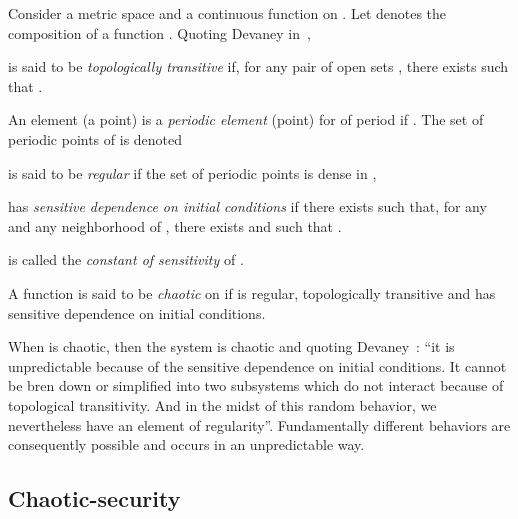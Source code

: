 \documentclass{llncs}
\begin{document}
Consider a metric space  and a continuous function  on . Let  denotes the  composition of a function . Quoting Devaney in~\cite{Devaney},

\begin{definition}
 is said to be \emph{topologically transitive} if, for any pair of open sets , there exists  such that .
\end{definition}

\begin{definition}
An element (a point)  is a \emph{periodic element} (point) for  of period  if . The set of periodic points of  is denoted 
\end{definition}

\begin{definition}
 is said to be \emph{regular} if the set of periodic points is dense in ,

\end{definition}

\begin{definition}
\label{sensitivity}  has \emph{sensitive dependence on initial conditions}
if there exists  such that, for any  and any neighborhood  of , there exists  and  such that .

 is called the \emph{constant of sensitivity} of .
\end{definition}


\begin{definition}
A function  is said to be \emph{chaotic} on  if  is regular, topologically transitive and has sensitive dependence on initial conditions.
\end{definition}

When  is chaotic, then the system  is chaotic and quoting Devaney~\cite{Devaney}: ``it is unpredictable because of the sensitive dependence on initial conditions. It cannot be bren down or simplified into two subsystems which do not interact because of topological transitivity. And in the midst of this random behavior, we nevertheless have an element of regularity''. Fundamentally different behaviors are consequently possible and occurs in an unpredictable way.



\subsection{Chaotic-security}
\label{CS}
\end{document}
